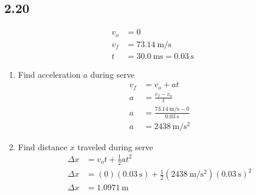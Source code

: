 \documentclass{article}
\begin{document}
\subsection{2.20}
\begin{align*}
	v_o & = 0 \\
	v_f & = \SI{73.14}{\meter \per \second} \\
	t & = \SI{30.0}{\milli \second} = \SI{0.03}{\second}
\end{align*}
\begin{enumerate}[label=\textbf{(\alph*)}]
	\item
		Find acceleration $ a $ during serve
		\begin{align*}
			v_f & = v_o + at \\
			a & = \frac{v_f - v_o}{t} \\
			a & = \frac{\SI{73.14}{\meter \per \second} - 0}{\SI{0.03}{\second}} \\
			a & = \SI{2438}{\meter \per \second \squared}
		\end{align*}
	\item
		Find distance $ x $ traveled during serve
		\begin{align*}
			\Delta x & = v_ot + \frac{1}{2}at^2 \\
			\Delta x & = (0)(\SI{0.03}{\second}) + \frac{1}{2}(\SI{2438}{\meter \per \second \squared})(\SI{0.03}{\second})^2 \\
			\Delta x & = \SI{1.0971}{\meter}
		\end{align*}
\end{enumerate}
\end{document}
